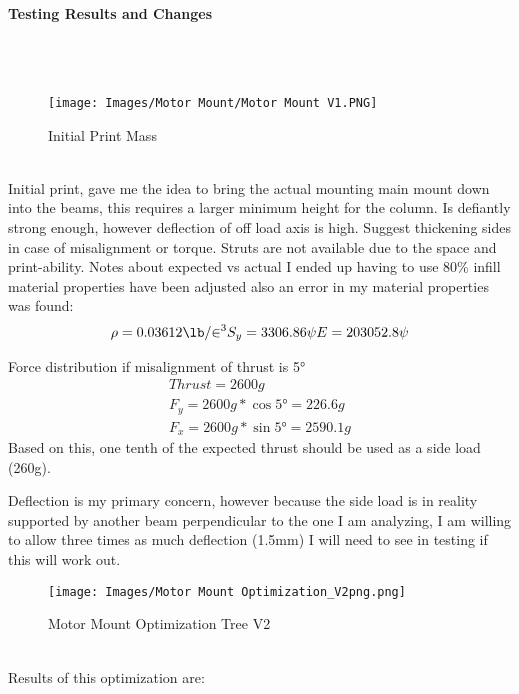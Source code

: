 \documentclass[12pt,letterpaper]{article}
\begin{document}
\pagebreak
\paragraph{Testing Results and Changes}
\setcounter{tocdepth}{4}
\setcounter{secnumdepth}{4}
\mbox{}\\\\
\begin{figure}[h]
    \centering
    \texttt{[image: Images/Motor Mount/Motor Mount V1.PNG]}
    \caption{Initial Print Mass}
    \label{fig:my_label}
\end{figure}\\
Initial print, gave me the idea to bring the actual mounting main mount down into the beams, this requires a larger minimum height for the column. Is defiantly strong enough, however deflection of off load axis is high. Suggest thickening sides in case of misalignment or torque. Struts are not available due to the space and print-ability. Notes about expected vs actual I ended up having to use 80\% infill material properties have been adjusted also an error in my material properties was found:
\begin{gather*}
\rho = 0.03612\unit{\lb\per\in\tothe{3}}
S_y = 3306.86\unit{\psi}
E = 203052.8\unit{\psi}
\end{gather*}

Force distribution if misalignment of thrust is 5\unit{\degree}
\begin{gather*}
Thrust = 2600\unit{g}\\
F_y = 2600\unit{g} * \cos{5\unit{\degree}} = 226.6\unit{g}\\
F_x = 2600\unit{g} * \sin{5\unit{\degree}} = 2590.1\unit{g}
\end{gather*}
Based on this, one tenth of the expected thrust should be used as a side load (260\unit{g}).

Deflection is my primary concern, however because the side load is in reality supported by another beam perpendicular to the one I am analyzing, I am willing to allow three times as much deflection (1.5\unit{mm}) I will need to see in testing if this will work out.
\pagebreak
\begin{figure}[h]
    \centering
    \texttt{[image: Images/Motor Mount Optimization\_V2png.png]}
    \caption{Motor Mount Optimization Tree V2}
    \label{fig:my_label}
\end{figure}\\

Results of this optimization are:
\end{document}
